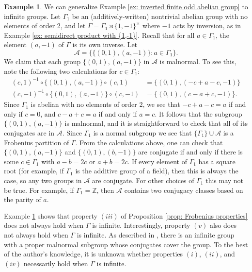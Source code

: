 \documentclass[12pt]{article}
\theoremstyle{definition}
\newtheorem{example}[theorem]{Example}
\newcommand{\bZ}{\mathbb Z}
\newcommand{\cA}{\mathcal{A}}
\begin{document}
\begin{example} \label{ex: inverted infinite abelian group}
We can generalize Example \ref{ex: inverted finite odd abelian group} to infinite groups. Let $\Gamma_1$ be an (additively-written) nontrivial abelian group with no elements of order $2$, and let $\Gamma = \Gamma_1 \rtimes \{1,-1\}^{\times}$ where $-1$ acts by inversion, as in Example \ref{ex: semidirect product with {1,-1}}.
Recall that for all $a \in \Gamma_1$, the element $(a, -1)$ of $\Gamma$ is its own inverse.
Let 
$$\cA = \Big\{\{(0,1), (a, -1)\} \colon a \in \Gamma_1\Big\}.$$
We claim that each group $\{(0,1), (a, -1)\}$ in $\cA$ is malnormal.
To see this, note the following two calculations for $c \in \Gamma_1$:
\begin{align*}
(c, 1)^{-1} \circ \{(0,1), (a, -1)\} \circ (c, 1) &= \{(0, 1), (-c + a - c, -1)\} \\ 
(c, -1)^{-1} \circ \{(0,1), (a, -1)\} \circ (c, -1) &= \{(0, 1), (c - a + c, -1)\}.
\end{align*}
Since $\Gamma_1$ is abelian with no elements of order $2$, we see that $-c + a - c = a$ if and only if $c = 0$, and $c - a + c = a$ if and only if $a = c$.
It follows that the subgroup $\{(0,1), (a, -1)\}$ is malnormal, and it is straightforward to check that all of its conjugates are in $\cA$.
Since $\Gamma_1$ is a normal subgroup we see that $\{\Gamma_1\} \cup \cA$ is a Frobenius partition of $\Gamma$.
From the calculations above, one can check that $\{(0,1), (a, -1)\}$ and $\{(0, 1), (b, -1)\}$ are conjugate if and only if there is some $c \in \Gamma_1$ with $a - b = 2c$ or $a + b = 2c$.
If every element of $\Gamma_1$ has a square root (for example, if $\Gamma_1$ is the additive group of a field), then this is always the case, so any two groups in $\cA$ are conjugate.
For other choices of $\Gamma_1$ this may not be true.
For example, if $\Gamma_1 = \bZ$, then $\cA$ contains two conjugacy classes based on the parity of $a$.
\end{example}


Example \ref{ex: inverted infinite abelian group} shows that property $(iii)$ of Proposition \ref{prop: Frobenius properties} does not always hold when $\Gamma$ is infinite.
Interestingly, property $(v)$ also does not always hold when $\Gamma$ is infinite.
As described in \cite[Example 5.2]{delaHarpe-Weber-2014}, there is an infinite group with a proper malnormal subgroup whose conjugates cover the group.
To the best of the author's knowledge, it is unknown whether properties $(i)$, $(ii)$, and $(iv)$ necessarily hold when $\Gamma$ is infinite.
\end{document}

